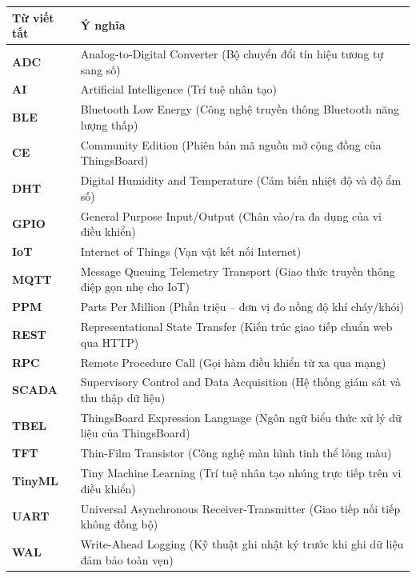 \begin{table}[H]
\centering
\begin{tabular}{|l|p{11.5cm}|}
\hline
\textbf{Từ viết tắt} & \textbf{Ý nghĩa} \\ \hline
\textbf{ADC} & Analog-to-Digital Converter (Bộ chuyển đổi tín hiệu tương tự sang số) \\ \hline
\textbf{AI} & Artificial Intelligence (Trí tuệ nhân tạo) \\ \hline
\textbf{BLE} & Bluetooth Low Energy (Công nghệ truyền thông Bluetooth năng lượng thấp) \\ \hline
\textbf{CE} & Community Edition (Phiên bản mã nguồn mở cộng đồng của ThingsBoard) \\ \hline
\textbf{DHT} & Digital Humidity and Temperature (Cảm biến nhiệt độ và độ ẩm số) \\ \hline
\textbf{GPIO} & General Purpose Input/Output (Chân vào/ra đa dụng của vi điều khiển) \\ \hline
\textbf{IoT} & Internet of Things (Vạn vật kết nối Internet) \\ \hline
\textbf{MQTT} & Message Queuing Telemetry Transport (Giao thức truyền thông điệp gọn nhẹ cho IoT) \\ \hline
\textbf{PPM} & Parts Per Million (Phần triệu -- đơn vị đo nồng độ khí cháy/khói) \\ \hline
\textbf{REST} & Representational State Transfer (Kiến trúc giao tiếp chuẩn web qua HTTP) \\ \hline
\textbf{RPC} & Remote Procedure Call (Gọi hàm điều khiển từ xa qua mạng) \\ \hline
\textbf{SCADA} & Supervisory Control and Data Acquisition (Hệ thống giám sát và thu thập dữ liệu) \\ \hline
\textbf{TBEL} & ThingsBoard Expression Language (Ngôn ngữ biểu thức xử lý dữ liệu của ThingsBoard) \\ \hline
\textbf{TFT} & Thin-Film Transistor (Công nghệ màn hình tinh thể lỏng màu) \\ \hline
\textbf{TinyML} & Tiny Machine Learning (Trí tuệ nhân tạo nhúng trực tiếp trên vi điều khiển) \\ \hline
\textbf{UART} & Universal Asynchronous Receiver-Transmitter (Giao tiếp nối tiếp không đồng bộ) \\ \hline
\textbf{WAL} & Write-Ahead Logging (Kỹ thuật ghi nhật ký trước khi ghi dữ liệu đảm bảo toàn vẹn) \\ \hline
\end{tabular}
\end{table}
\newpage
